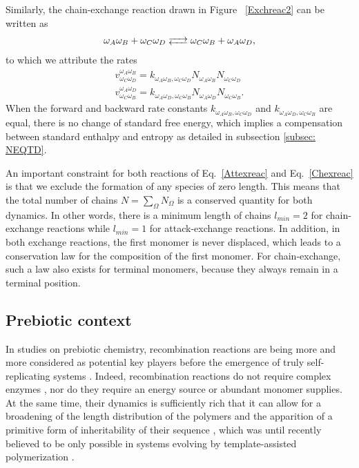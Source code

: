 \documentclass[
	amsmath,
	amssymb,
	a4paper,
	aip,		%
	jcp,		%
	reprint, twocolumn  %
	fleqn,
	showpacs,
	floatfix
]{revtex4-1}
\begin{document}
Similarly, the chain-exchange reaction drawn in Figure ~\ref{Exchreac2} can be written as
\begin{equation}
	\begin{split}
\omega_{A}\omega_{B} +\omega_{C} \omega_{D} \ce{<-->} \omega_{C}\omega_{B} +\omega_{A} \omega_{D} ,
\label{Chexreac}
\end{split} 
\end{equation}
to which we attribute the rates
\begin{equation}
	\begin{split}
v^{\omega_{A} \omega_{B}}_{\omega_{C} \omega_{D}}=k_{\omega_{A} \omega_{B}, \omega_{C} \omega_{D}}  N_{\omega_{A} \omega_{B}} N_{\omega_{C} \omega_{D}}  \\
v^{\omega_{A} \omega_{D}}_{\omega_{C} \omega_{B}}=k_{\omega_{A} \omega_{D}, \omega_{C} \omega_{B}}  N_{\omega_{A} \omega_{D}} N_{\omega_{C} \omega_{B}}.
\label{Ratechex}
\end{split} 
\end{equation}
When the forward and backward rate constants $k_{\omega_{A} \omega_{B}, \omega_{C} \omega_{D}}$ and $k_{\omega_{A} \omega_{D}, \omega_{C} \omega_{B}}$  are equal, there is no change of standard free energy, which implies a compensation between 
standard enthalpy and entropy as detailed in subsection \ref{subsec: NEQTD}.

An important constraint for both reactions of Eq.~\eqref{Attexreac} and Eq.~\eqref{Chexreac} is that 
we exclude the formation of any species of zero length. 
This means that the total number of chains $N=\sum_\Omega N_\Omega$ is a conserved quantity for both dynamics.
In other words, there is a minimum length
of chains $l_{min}=2$ for chain-exchange reactions while $l_{min}=1$ for attack-exchange reactions.
In addition, in both exchange reactions, the first monomer is never displaced, 
which leads to a conservation law for the composition of the first monomer. 
For chain-exchange, such a law also exists for terminal monomers, because 
they always remain in a terminal position. 


\subsection{Prebiotic context}

In studies on prebiotic chemistry, recombination reactions are being more and more 
considered as potential key players before the emergence of truly self-replicating systems \cite{Higgs2015}. 
Indeed, recombination reactions do not require complex enzymes \cite{Nechaev2009} \cite{Lehman2008}, 
nor do they require an energy source or abundant monomer supplies.
At the same time, their dynamics is sufficiently
rich that it can allow for a broadening of the length distribution of the polymers and the apparition 
of a primitive form of inheritability of their sequence \cite{Lehman2008}, which was until recently believed to 
be only possible in systems evolving by template-assisted polymerization \cite{Derr12}. 
\end{document}

